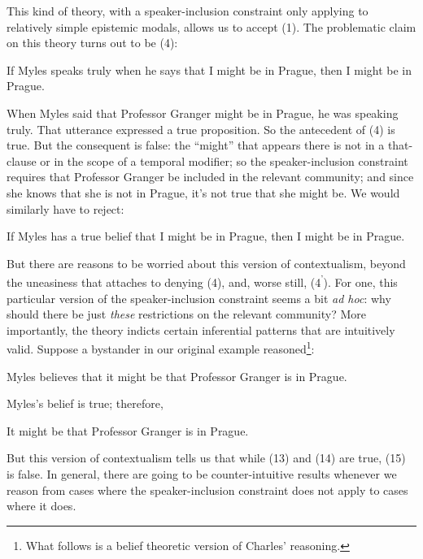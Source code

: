 \documentclass[
  11pt,
  letterpaper,
  DIV=11,
  numbers=noendperiod,
  twoside]{scrartcl}
\providecommand{\tightlist}{%
  \setlength{\itemsep}{0pt}\setlength{\parskip}{0pt}}
\begin{document}
This kind of theory, with a speaker-inclusion constraint only applying
to relatively simple epistemic modals, allows us to accept (1). The
problematic claim on this theory turns out to be (4):

\begin{description}
\tightlist
\item[(4)]
If Myles speaks truly when he says that I might be in Prague, then I
might be in Prague.
\end{description}

When Myles said that Professor Granger might be in Prague, he was
speaking truly. That utterance expressed a true proposition. So the
antecedent of (4) is true. But the consequent is false: the ``might''
that appears there is not in a that-clause or in the scope of a temporal
modifier; so the speaker-inclusion constraint requires that Professor
Granger be included in the relevant community; and since she knows that
she is not in Prague, it's not true that she might be. We would
similarly have to reject:

\begin{description}
\tightlist
\item[(4\textsuperscript{'})]
If Myles has a true belief that I might be in Prague, then I might be in
Prague.
\end{description}

But there are reasons to be worried about this version of contextualism,
beyond the uneasiness that attaches to denying (4), and, worse still,
(4\textsuperscript{'}). For one, this particular version of the
speaker-inclusion constraint seems a bit \emph{ad hoc}: why should there
be just \emph{these} restrictions on the relevant community? More
importantly, the theory indicts certain inferential patterns that are
intuitively valid. Suppose a bystander in our original example
reasoned\footnote{What follows is a belief theoretic version of Charles'
  reasoning.}:

\begin{description}
\tightlist
\item[(13)]
Myles believes that it might be that Professor Granger is in Prague.
\item[(14)]
Myles's belief is true; therefore,
\item[(15)]
It might be that Professor Granger is in Prague.
\end{description}

But this version of contextualism tells us that while (13) and (14) are
true, (15) is false. In general, there are going to be counter-intuitive
results whenever we reason from cases where the speaker-inclusion
constraint does not apply to cases where it does.
\end{document}
